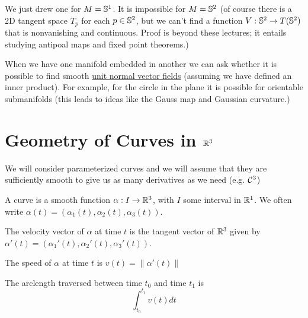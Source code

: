 We just drew one for $M = \mathbb{S}^1$. It is impossible for $M =
\mathbb{S}^2$ (of course there is a 2D tangent space $T_p$ for each $p
\in \mathbb{S}^2$, but we can't find a function $V: \mathbb{S}^2 \rightarrow
T(\mathbb{S}^2)$ that is nonvanishing and continuous. Proof is beyond
these lectures; it entails studying antipoal maps and fixed point
theorems.)

When we have one manifold embedded in another we can ask whether it is
possible to find smooth \underline{unit normal vector fields}
(assuming we have defined an inner product). For example, for the
circle in the plane it is possible for orientable submanifolds (this
leads to ideas like the Gauss map and Gaussian curvature.)

\section{Geometry of Curves in $\mathbb{R}^3$}
\label{sec:geom-curv-real3}

We will consider parameterized curves and we will assume that they are
sufficiently smooth to give us as many derivatives as we need
(e.g. $\mathcal{C}^3$)

\begin{definition}[Curve]
  A curve is a smooth function $\alpha: I \rightarrow \mathbb{R}^3$, with $I$
some interval in $\mathbb{R}^1$. We often write $\alpha(t) = (\alpha_1(t),
\alpha_2(t), \alpha_3(t))$.
\end{definition}

\begin{definition}
  The velocity vector of $\alpha$ at time $t$ is the tangent vector of
  $\mathbb{R}^3$ given by $\alpha'(t) = (\alpha_1'(t), \alpha_2'(t),
  \alpha_3'(t))$. 
\end{definition}

\begin{definition}[Speed]
  The speed of $\alpha$ at time $t$ is $v(t) = \|\alpha'(t)\|$
\end{definition}

\begin{definition}
  The arclength traversed between time $t_0$ and time $t_1$ is
  \begin{equation*}
    \int_{t_0}^{t_1} v(t) dt
  \end{equation*}
\end{definition}

